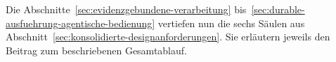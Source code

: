 Die Abschnitte~\ref{sec:evidenzgebundene-verarbeitung}
bis~\ref{sec:durable-ausfuehrung-agentische-bedienung} vertiefen nun
die sechs Säulen aus Abschnitt~\ref{sec:konsolidierte-designanforderungen}.
Sie erläutern jeweils den Beitrag zum beschriebenen Gesamtablauf.


